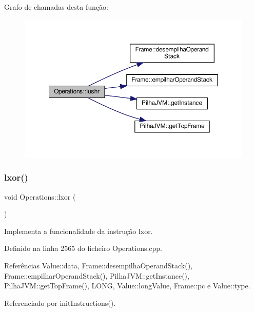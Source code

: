 Grafo de chamadas desta função\+:
\nopagebreak
\begin{figure}[H]
\begin{center}
\leavevmode
\includegraphics[width=350pt]{classOperations_a3b7c61f8bca7b3ad0dacae6649aee042_cgraph}
\end{center}
\end{figure}
\mbox{\label{classOperations_ac135e723f1ac6a27c736e6b8e7d06a45}} 
\subsubsection{\texorpdfstring{lxor()}{lxor()}}
{\footnotesize\ttfamily void Operations\+::lxor (\begin{DoxyParamCaption}{ }\end{DoxyParamCaption})\hspace{0.3cm}{\ttfamily [private]}}



Implementa a funcionalidade da instrução lxor. 



Definido na linha 2565 do ficheiro Operations.\+cpp.



Referências Value\+::data, Frame\+::desempilha\+Operand\+Stack(), Frame\+::empilhar\+Operand\+Stack(), Pilha\+J\+V\+M\+::get\+Instance(), Pilha\+J\+V\+M\+::get\+Top\+Frame(), L\+O\+NG, Value\+::long\+Value, Frame\+::pc e Value\+::type.



Referenciado por init\+Instructions().


